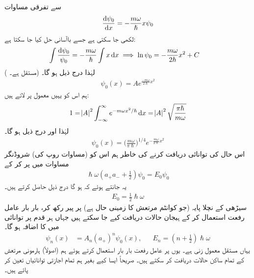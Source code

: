 سے تفرقی مساوات
\begin{align*}
\frac{ \dif  \psi_0}{\dif x } = -\frac{m \omega }{ \hslash } x \psi_0
\end{align*}
لکھی جا سکتی ہے جسے باآسانی حل کیا جا سکتا ہے: 
\begin{align*}
\int{\frac{ \dif \psi_0 }{ \psi_0 } } &= -\frac{ m \omega }{ \hslash } \int{ x \dif x } \implies \ln \psi_0 = 
-\frac{m \omega }{ 2 \hslash } x^2 +C  
\end{align*} 
( مستقل ہے۔) لہٰذا درج ذیل ہو گا۔
\begin{align*}
\psi_0 (x) = A e^{\frac{ - m \omega }{ 2 \hslash } x^2}
\end{align*}
ہم اس کو یہیں معمول پر لاتے ہیں: 
\begin{align*}
1 = \abs{A}^2 \int_{ - \infty}^{ \infty } e^{- m \omega x^2/ \hslash}  \dif x = \abs{A}^2  \sqrt{ \frac{ \pi \hslash }{ m \omega }}
\end{align*}
لہٰذا  اور درج ذیل ہو گا۔
\\
\begin{align}\label{مساوات_شروڈنگر_معمول_شدہ_حال_صفر}
\psi_0 (x) = \big(\frac{ m \omega }{ \pi  \hslash}\big)^{1/4} e^{-\frac{ m \omega }{ 2 \hslash} x^2}
\end{align}
اس حال کی توانائی دریافت کرنے کی خاطر ہم اس کو (مساوات  روپ کی) شروڈنگر  مساوات میں پر کر کے
\begin{align*}
\hslash \omega (a_+ a_- + \tfrac{1}{2} )\psi_0 = E_0 \psi_0 
\end{align*}
 یہ جانتے ہوئے کہ  ہو گا درج ذیل حاصل کرتے ہیں۔
\begin{align}
 E_0 = \frac{1}{2} \hslash \omega 
\end{align}
سیڑھی کے نچلا پایہ (جو کوانٹم مرتعش کا زمینی حال ہے)  پر پیر رکھ کر،   بار بار عامل رفعت استعمال کر کے ہیجان حالات دریافت کیے جا سکتے ہیں جہاں ہر قدم پر توانائی میں  کا اضافہ ہو گا۔
\begin{align}\label{مساوات_شروڈنگر_ہارمونی_حالات}
\psi_n (x) &= A_n ( a_+)^n \psi_0(x) , && E_n = ( n + \tfrac{1}{2}) \hslash \omega
\end{align}
یہاں  مستقل معمول زنی ہے۔ یوں  پر عامل رفعت بار بار استعمال کرتے ہوئے ہم (اصولاً)  ہارمونی مرتعش کے تمام ساکن حالات دریافت کر سکتے ہیں۔ صریحاً ایسا کیے بغیر ہم تمام  اجازتی توانائیاں تعین کر پائے ہیں۔


